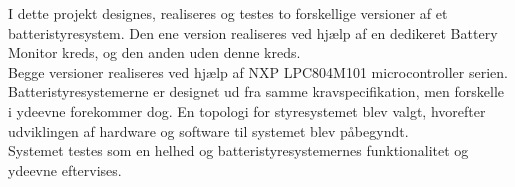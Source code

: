 I dette projekt designes, realiseres og testes to forskellige versioner af et batteristyresystem. Den ene version realiseres ved hjælp af en dedikeret Battery Monitor kreds, og den anden uden denne kreds.
\\

Begge versioner realiseres ved hjælp af NXP LPC804M101 microcontroller serien. Batteristyresystemerne er designet ud fra samme kravspecifikation, men forskelle i ydeevne forekommer dog. En topologi for styresystemet blev valgt, hvorefter udviklingen af hardware og software til systemet blev påbegyndt.
\\

Systemet testes som en helhed og batteristyresystemernes funktionalitet og ydeevne eftervises.
